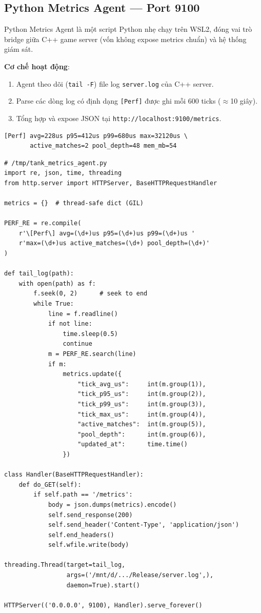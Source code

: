 \documentclass[12pt,a4paper]{report}
\begin{document}
\subsection{Python Metrics Agent --- Port 9100}

Python Metrics Agent là một script Python nhẹ chạy trên WSL2, đóng vai trò bridge giữa C++ game server (vốn không expose metrics chuẩn) và hệ thống giám sát.

\textbf{Cơ chế hoạt động}:
\begin{enumerate}
  \item Agent theo dõi (\texttt{tail -F}) file log \texttt{server.log} của C++ server.
  \item Parse các dòng log có định dạng \texttt{[Perf]} được ghi mỗi 600 ticks ($\approx$10 giây).
  \item Tổng hợp và expose JSON tại \texttt{http://localhost:9100/metrics}.
\end{enumerate}

\begin{lstlisting}[style=bashStyle, caption={Format log [Perf] mà C++ server ghi ra}, label={lst:perflog}]
[Perf] avg=228us p95=412us p99=680us max=32120us \
       active_matches=2 pool_depth=48 mem_mb=54
\end{lstlisting}

\begin{lstlisting}[style=bashStyle, caption={Python Metrics Agent: thu thập và expose metrics}, label={lst:pyagent}]
# /tmp/tank_metrics_agent.py
import re, json, time, threading
from http.server import HTTPServer, BaseHTTPRequestHandler

metrics = {}  # thread-safe dict (GIL)

PERF_RE = re.compile(
    r'\[Perf\] avg=(\d+)us p95=(\d+)us p99=(\d+)us '
    r'max=(\d+)us active_matches=(\d+) pool_depth=(\d+)'
)

def tail_log(path):
    with open(path) as f:
        f.seek(0, 2)      # seek to end
        while True:
            line = f.readline()
            if not line:
                time.sleep(0.5)
                continue
            m = PERF_RE.search(line)
            if m:
                metrics.update({
                    "tick_avg_us":     int(m.group(1)),
                    "tick_p95_us":     int(m.group(2)),
                    "tick_p99_us":     int(m.group(3)),
                    "tick_max_us":     int(m.group(4)),
                    "active_matches":  int(m.group(5)),
                    "pool_depth":      int(m.group(6)),
                    "updated_at":      time.time()
                })

class Handler(BaseHTTPRequestHandler):
    def do_GET(self):
        if self.path == '/metrics':
            body = json.dumps(metrics).encode()
            self.send_response(200)
            self.send_header('Content-Type', 'application/json')
            self.end_headers()
            self.wfile.write(body)

threading.Thread(target=tail_log,
                 args=('/mnt/d/.../Release/server.log',),
                 daemon=True).start()

HTTPServer(('0.0.0.0', 9100), Handler).serve_forever()
\end{lstlisting}
\end{document}
